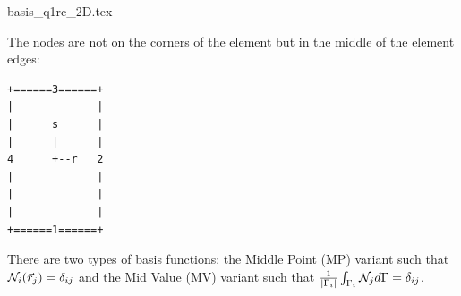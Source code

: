 \begin{flushright} {\tiny {\color{gray} basis\_q1rc\_2D.tex}} \end{flushright}

The nodes are not on the corners of the element but in the middle of the
element edges:



\begin{verbatim}
+======3======+
|             |
|      s      |
|      |      |
4      +--r   2
|             |
|             |
|             |
+======1======+
\end{verbatim}

There are two types of basis functions: the Middle Point (MP) variant
such that ${\mathcal{N}}_i(\vec{r}_j)=\delta_{ij}$ and the Mid Value (MV) variant
such that $\frac{1}{|\Gamma_i|} \int_{\Gamma_i} {\mathcal{N}}_j d\Gamma = \delta_{ij}$.

